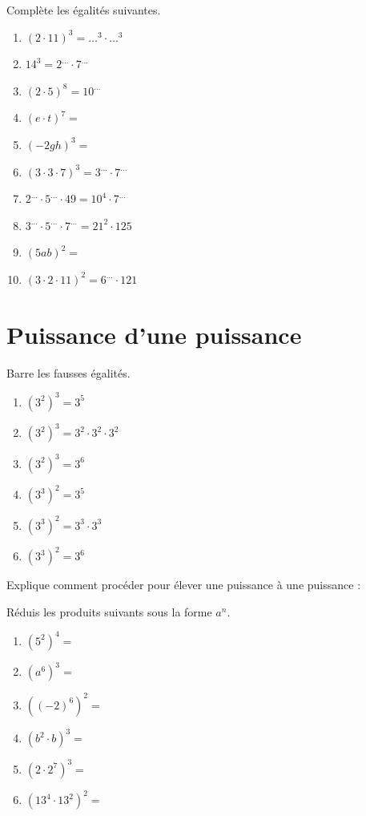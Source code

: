 \documentclass[../../syllabus_2.tex]{subfiles}
\begin{document}
\begin{exercise}
	Complète les égalités suivantes.
	\begin{enumerate} [cols=2]
		\item \((2\cdot11)^3=\dots^3\cdot\dots^3\)
		\item \(14^3=2^{\dots}\cdot7^{\dots}\)
		\item \((2\cdot5)^8=10^{\dots}\)
		\item \((e\cdot t)^7=\)
		\item \((-2gh)^3=\)
		\item \((3\cdot3\cdot7)^3=3^{\dots}\cdot 7^{\dots}\)
		\item \(2^{\dots} \cdot 5^{\dots}\cdot 49 = 10^4\cdot 7^{\dots}\)
		\item \(3^{\dots}\cdot5^{\dots}\cdot7^{\dots}=21^2\cdot125\)
		\item \((5ab)^2=\)
		\item \((3\cdot2\cdot11)^2=6^{\dots}\cdot121\)
	\end{enumerate}
\end{exercise}

\pagebreak
\section{Puissance d'une puissance}
Barre les fausses égalités.
\begin{enumerate} [cols=3, itemsep=0.8cm, label=]
	\item \((3^2)^3=3^5\)
	\item \((3^2)^3=3^2\cdot 3^2\cdot 3^2\)
	\item \( (3^2)^3=3^6\)
	\item \((3^3)^2=3^5\)
	\item \((3^3)^2=3^3\cdot3^3\)
	\item \((3^3)^2=3^6\)
\end{enumerate}

Explique comment procéder pour élever une puissance à une puissance :


\begin{center}
\end{center}

\begin{exercise}
	Réduis les produits suivants sous la forme \(a^n\).
	\begin{enumerate} [cols=3, itemsep=2em]
		\item \((5^2)^4=\)
		\item \((a^6)^3=\)
		\item \(\left((-2)^6\right)^2=\)
		\item \(\left(b^2\cdot b\right)^3=\)
		\item \(\left(2\cdot 2^7\right)^3=\)
		\item \(\left(13^4\cdot13^2\right)^2=\)
	\end{enumerate}
\end{exercise}
\end{document}
